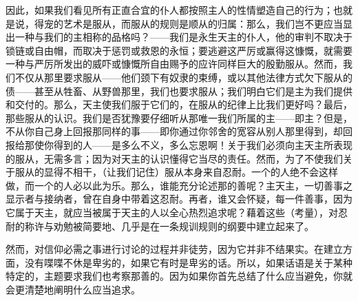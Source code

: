 因此，如果我们看见所有正直合宜的仆人都按照主人的性情塑造自己的行为；也就是说，得宠的艺术是服从，而服从的规则是顺从的归属：那么，我们岂不更应当显出一种与我们的主相称的品格吗？——我们是永生天主的仆人，他的审判不取决于锁链或自由帽，而取决于惩罚或救恩的永恒；要逃避这严厉或赢得这慷慨，就需要一种与严厉所发出的威吓或慷慨所自由赐予的应许同样巨大的殷勤服从。然而，我们不仅从那里要求服从——他们颈下有奴隶的束缚，或以其他法律方式欠下服从的债——甚至从牲畜、从野兽那里，我们也要求服从；我们明白它们是主为我们提供和交付的。那么，天主使我们服于它们的，在服从的纪律上比我们更好吗？最后，那些服从的认识。我们是否犹豫要仔细听从那唯一我们所属的主——即主？但是，不从你自己身上回报那同样的事——即你通过你邻舍的宽容从别人那里得到，却回报给那使你得到的人——是多么不义，多么忘恩啊！关于我们必须向主天主所表现的服从，无需多言；因为对天主的认识懂得它当尽的责任。然而，为了不使我们关于服从的显得不相干，（让我们记住）服从本身来自忍耐。一个的人绝不会这样做，而一个的人必以此为乐。那么，谁能充分论述那的善呢？主天主，一切善事之显示者与接纳者，曾在自身中带着这忍耐。再者，谁又会怀疑，每一件善事，因为它属于天主，就应当被属于天主的人以全心热烈追求呢？藉着这些（考量），对忍耐的称许与劝勉被简要地、几乎是在一条规训规则的纲要中建立起来了。\par


然而，对信仰必需之事进行讨论的过程并非徒劳，因为它并非不结果实。在建立方面，没有喋喋不休是卑劣的，如果它有时是卑劣的话。所以，如果话语是关于某种特定的，主题要求我们也考察那善的。因为如果你首先总结了什么应当避免，你就会更清楚地阐明什么应当追求。\par

